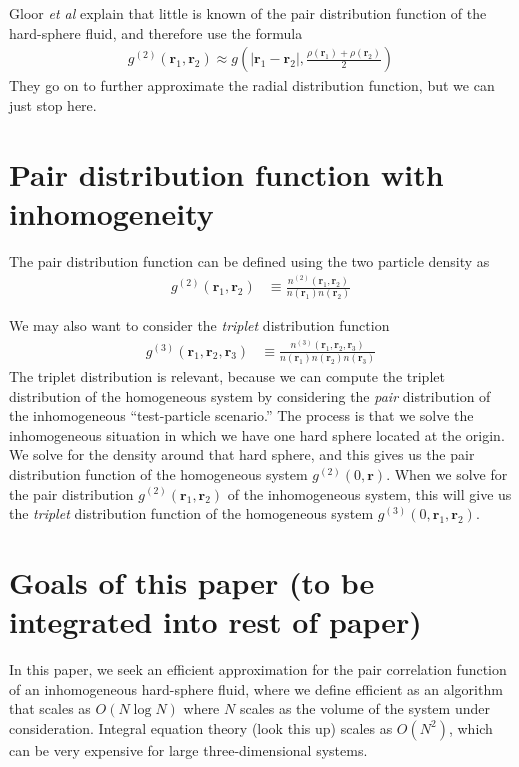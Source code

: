 \documentclass[letterpaper,twocolumn,amsmath,amssymb,pre]{revtex4-1}
\newcommand{\rr}{\textbf{r}}
\begin{document}
Gloor \emph{et al} explain that little is known of the pair
distribution function of the hard-sphere fluid, and therefore use the
formula
\begin{align}
  g^{(2)}(\rr_1,\rr_2) \approx g\left(|\rr_1-\rr_2|, \frac{\rho(\rr_1)+\rho(\rr_2)}2\right)
\end{align}
They go on to further approximate the radial distribution function,
but we can just stop here.


\section{Pair distribution function with inhomogeneity}

The pair distribution function can be defined using the two particle
density as
\begin{align}
  g^{(2)}(\rr_1,\rr_2) &\equiv \frac{n^{(2)}(\rr_1,\rr_2)}{n(\rr_1)n(\rr_2)}
\end{align}

We may also want to consider the \emph{triplet} distribution function
\begin{align}
  g^{(3)}(\rr_1,\rr_2,\rr_3) &\equiv \frac{n^{(3)}(\rr_1,\rr_2,\rr_3)}{n(\rr_1)n(\rr_2)n(\rr_3)}
\end{align}
The triplet distribution is relevant, because we can compute the
triplet distribution of the homogeneous system by considering the
\emph{pair} distribution of the inhomogeneous ``test-particle
scenario.''  The process is that we solve the inhomogeneous situation
in which we have one hard sphere located at the origin.  We solve for
the density around that hard sphere, and this gives us the pair
distribution function of the homogeneous system $g^{(2)}(0, \rr)$.
When we solve for the pair distribution $g^{(2)}(\rr_1,\rr_2)$ of the
inhomogeneous system, this will give us the \emph{triplet}
distribution function of the homogeneous system
$g^{(3)}(0,\rr_1,\rr_2)$.

\section{Goals of this paper (to be integrated into rest of paper)}


In this paper, we seek an efficient approximation for the pair
correlation function of an inhomogeneous hard-sphere fluid, where we
define efficient as an algorithm that scales as $O(N\log N)$ where $N$
scales as the volume of the system under consideration.
Integral equation theory (look this up) scales as $O(N^2)$, which can
be very expensive for large three-dimensional systems.
\end{document}
